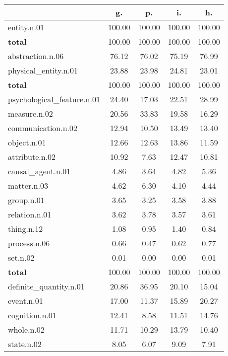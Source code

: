 \begin{table}[h!]
\begin{center}
\begin{tabular}{| l || c | c | c | c |}\hline
 & {\bf g.} & {\bf p.} & {\bf i.} & {\bf h.} \\\hline\hline
entity.n.01 & 100.00  & 100.00  & 100.00  & 100.00 \\\hline\hline
{{\bf total}} & 100.00  & 100.00  & 100.00  & 100.00 \\\hline\hline\hline
abstraction.n.06 & 76.12  & 76.02  & 75.19  & 76.99 \\\hline
physical\_entity.n.01 & 23.88  & 23.98  & 24.81  & 23.01 \\\hline\hline
{{\bf total}} & 100.00  & 100.00  & 100.00  & 100.00 \\\hline\hline\hline
psychological\_feature.n.01 & 24.40  & 17.03  & 22.51  & 28.99 \\\hline
measure.n.02 & 20.56  & 33.83  & 19.58  & 16.29 \\\hline
communication.n.02 & 12.94  & 10.50  & 13.49  & 13.40 \\\hline
object.n.01 & 12.66  & 12.63  & 13.86  & 11.59 \\\hline
attribute.n.02 & 10.92  & 7.63  & 12.47  & 10.81 \\\hline
causal\_agent.n.01 & 4.86  & 3.64  & 4.82  & 5.36 \\\hline
matter.n.03 & 4.62  & 6.30  & 4.10  & 4.44 \\\hline
group.n.01 & 3.65  & 3.25  & 3.58  & 3.88 \\\hline
relation.n.01 & 3.62  & 3.78  & 3.57  & 3.61 \\\hline
thing.n.12 & 1.08  & 0.95  & 1.40  & 0.84 \\\hline
process.n.06 & 0.66  & 0.47  & 0.62  & 0.77 \\\hline
set.n.02 & 0.01  & 0.00  & 0.00  & 0.01 \\\hline\hline
{{\bf total}} & 100.00  & 100.00  & 100.00  & 100.00 \\\hline\hline\hline
definite\_quantity.n.01 & 20.86  & 36.95  & 20.10  & 15.04 \\\hline
event.n.01 & 17.00  & 11.37  & 15.89  & 20.27 \\\hline
cognition.n.01 & 12.41  & 8.58  & 11.51  & 14.76 \\\hline
whole.n.02 & 11.71  & 10.29  & 13.79  & 10.40 \\\hline
state.n.02 & 8.05  & 6.07  & 9.09  & 7.91 \\\hline

\end{tabular}
\end{center}
\end{table}
